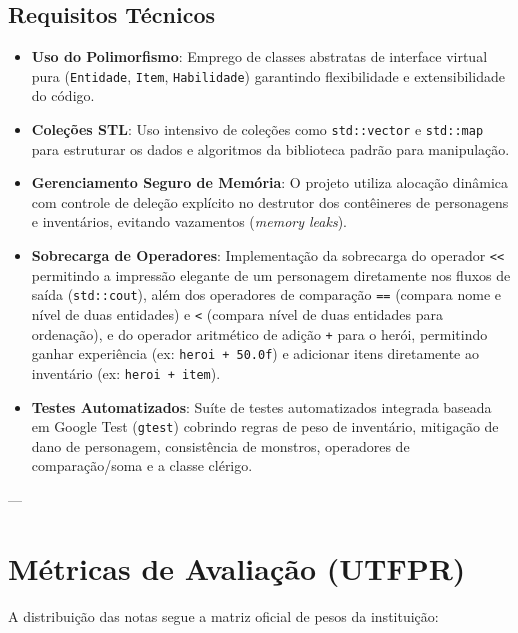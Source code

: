 \documentclass[12pt,a4paper]{article}
\begin{document}
\subsection{Requisitos Técnicos}
\begin{itemize}
    \item \textbf{Uso do Polimorfismo}: Emprego de classes abstratas de interface virtual pura (\texttt{Entidade}, \texttt{Item}, \texttt{Habilidade}) garantindo flexibilidade e extensibilidade do código.
    \item \textbf{Coleções STL}: Uso intensivo de coleções como \texttt{std::vector} e \texttt{std::map} para estruturar os dados e algoritmos da biblioteca padrão para manipulação.
    \item \textbf{Gerenciamento Seguro de Memória}: O projeto utiliza alocação dinâmica com controle de deleção explícito no destrutor dos contêineres de personagens e inventários, evitando vazamentos (\textit{memory leaks}).
    \item \textbf{Sobrecarga de Operadores}: Implementação da sobrecarga do operador \texttt{<<} permitindo a impressão elegante de um personagem diretamente nos fluxos de saída (\texttt{std::cout}), além dos operadores de comparação \texttt{==} (compara nome e nível de duas entidades) e \texttt{<} (compara nível de duas entidades para ordenação), e do operador aritmético de adição \texttt{+} para o herói, permitindo ganhar experiência (ex: \texttt{heroi + 50.0f}) e adicionar itens diretamente ao inventário (ex: \texttt{heroi + item}).
    \item \textbf{Testes Automatizados}: Suíte de testes automatizados integrada baseada em Google Test (\texttt{gtest}) cobrindo regras de peso de inventário, mitigação de dano de personagem, consistência de monstros, operadores de comparação/soma e a classe clérigo.
\end{itemize}

---

\section{Métricas de Avaliação (UTFPR)}
A distribuição das notas segue a matriz oficial de pesos da instituição:
\end{document}

